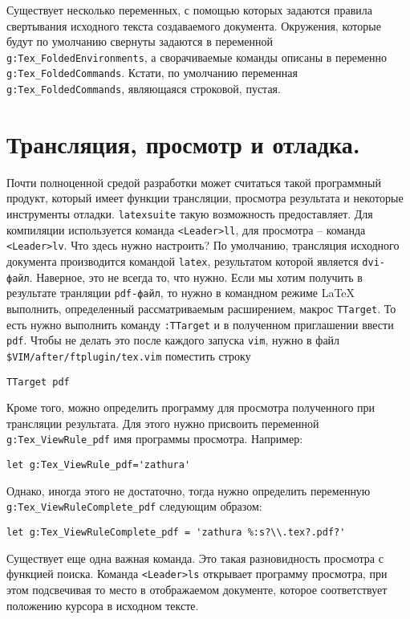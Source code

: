 \documentclass[a4paper]{article}
\begin{document}
Существует  несколько переменных, с помощью которых задаются правила свертывания исходного текста
создаваемого документа. Окружения, которые будут по умолчанию свернуты задаются в переменной
\verb|g:Tex_FoldedEnvironments|, а сворачиваемые команды описаны в переменно \verb|g:Tex_FoldedCommands|.
Кстати, по умолчанию переменная \verb|g:Tex_FoldedCommands|, являющаяся строковой, пустая.

\part{Трансляция, просмотр и отладка.}
Почти полноценной средой разработки может считаться такой программный продукт, который
имеет функции трансляции, просмотра результата и некоторые инструменты отладки. \texttt{latexsuite} такую возможность
предоставляет. Для компиляции используется команда \texttt{<Leader>ll}, для просмотра -- команда
\texttt{<Leader>lv}. Что здесь нужно настроить? По умолчанию, трансляция исходного документа
производится командой \texttt{latex}, результатом которой является \texttt{dvi-файл}. 
Наверное, это не всегда то, что нужно. Если мы хотим получить в результате транляции
\texttt{pdf-файл}, то нужно в командном режиме \LaTeX{} выполнить, определенный рассматриваемым
расширением, макрос \texttt{TTarget}. То есть нужно выполнить команду \verb|:TTarget| и 
в полученном приглашении ввести \texttt{pdf}. Чтобы не делать это после каждого запуска
\texttt{vim}, нужно в файл \verb|$VIM/after/ftplugin/tex.vim| поместить строку
\begin{verbatim}
TTarget pdf
\end{verbatim}
Кроме того, можно определить программу для просмотра полученного при трансляции результата.
Для этого нужно присвоить переменной \verb|g:Tex_ViewRule_pdf| имя программы просмотра. Например:
\begin{verbatim}
let g:Tex_ViewRule_pdf='zathura'
\end{verbatim}
Однако, иногда этого не достаточно, тогда нужно определить переменную \verb|g:Tex_ViewRuleComplete_pdf| 
следующим образом:
\begin{verbatim}
let g:Tex_ViewRuleComplete_pdf = 'zathura %:s?\\.tex?.pdf?'
\end{verbatim}

Существует еще одна важная команда. Это такая разновидность просмотра с функцией поиска.
Команда \texttt{<Leader>ls} открывает программу просмотра, при этом подсвечивая то место
в отображаемом документе, которое соответствует положению курсора в исходном тексте.
\end{document}
